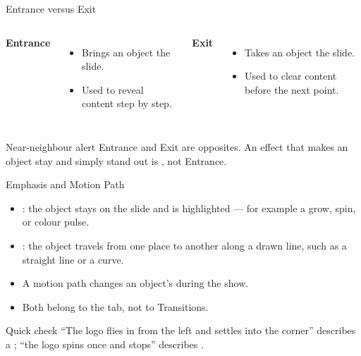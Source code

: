 \documentclass[aspectratio=169]{beamer}
\begin{document}
\begin{frame}{Entrance versus Exit}
  \begin{columns}[T]
      \textbf{Entrance}
      \begin{itemize}
        \item Brings an object  the slide.
        \item Used to reveal content step by step.
      \end{itemize}
      \textbf{Exit}
      \begin{itemize}
        \item Takes an object  the slide.
        \item Used to clear content before the next point.
      \end{itemize}
  \end{columns}
  \vspace{0.3cm}
  \begin{alertblock}{Near-neighbour alert}
    Entrance and Exit are opposites. An effect that makes an object stay and
    simply stand out is , not Entrance.
  \end{alertblock}
\end{frame}

\begin{frame}{Emphasis and Motion Path}
  \begin{itemize}
    \item {}: the object stays on the slide and is highlighted ---
      for example a grow, spin, or colour pulse.
    \item {}: the object travels from one place to another
      along a drawn line, such as a straight line or a curve.
    \item A motion path changes an object's  during the show.
    \item Both belong to the  tab, not to Transitions.
  \end{itemize}
  \begin{exampleblock}{Quick check}
    ``The logo flies in from the left and settles into the corner''
    describes a ; ``the logo spins once and stops''
    describes .
  \end{exampleblock}
\end{frame}
\end{document}

